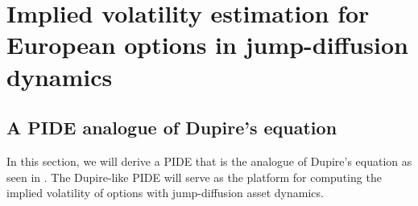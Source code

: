 \chapter[Implied volatility estimation for European options in jump-diffusion dynamics]{Implied volatility estimation for European options in jump-diffusion dynamics}

\section{A PIDE analogue of Dupire's equation}
In this section, we will derive a PIDE that is the analogue of Dupire's equation as seen in \cite{Gatheral2006}. The Dupire-like PIDE will serve as the platform for computing the implied volatility of options with jump-diffusion asset dynamics.

